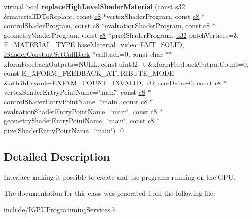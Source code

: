 \begin{DoxyCompactItemize}
\item 
virtual bool {\bfseries replace\+High\+Level\+Shader\+Material} (const \hyperlink{namespaceirr_ac66849b7a6ed16e30ebede579f9b47c6}{s32} \&material\+I\+D\+To\+Replace, const \hyperlink{namespaceirr_a9395eaea339bcb546b319e9c96bf7410}{c8} $\ast$vertex\+Shader\+Program, const \hyperlink{namespaceirr_a9395eaea339bcb546b319e9c96bf7410}{c8} $\ast$control\+Shader\+Program, const \hyperlink{namespaceirr_a9395eaea339bcb546b319e9c96bf7410}{c8} $\ast$evaluation\+Shader\+Program, const \hyperlink{namespaceirr_a9395eaea339bcb546b319e9c96bf7410}{c8} $\ast$geometry\+Shader\+Program, const \hyperlink{namespaceirr_a9395eaea339bcb546b319e9c96bf7410}{c8} $\ast$pixel\+Shader\+Program, \hyperlink{namespaceirr_a0416a53257075833e7002efd0a18e804}{u32} patch\+Vertices=3, \hyperlink{namespaceirr_1_1video_ac8e9b6c66f7cebabd1a6d30cbc5430f1}{E\+\_\+\+M\+A\+T\+E\+R\+I\+A\+L\+\_\+\+T\+Y\+PE} base\+Material=\hyperlink{namespaceirr_1_1video_ac8e9b6c66f7cebabd1a6d30cbc5430f1a9bc471b9c18c9e2d20496004d2a2e803}{video\+::\+E\+M\+T\+\_\+\+S\+O\+L\+ID}, \hyperlink{classirr_1_1video_1_1IShaderConstantSetCallBack}{I\+Shader\+Constant\+Set\+Call\+Back} $\ast$callback=0, const char $\ast$$\ast$xform\+Feedback\+Outputs=N\+U\+LL, const uint32\+\_\+t \&xform\+Feedback\+Output\+Count=0, const E\+\_\+\+X\+F\+O\+R\+M\+\_\+\+F\+E\+E\+D\+B\+A\+C\+K\+\_\+\+A\+T\+T\+R\+I\+B\+U\+T\+E\+\_\+\+M\+O\+DE \&attrib\+Layout=E\+X\+F\+A\+M\+\_\+\+C\+O\+U\+N\+T\+\_\+\+I\+N\+V\+A\+L\+ID, \hyperlink{namespaceirr_ac66849b7a6ed16e30ebede579f9b47c6}{s32} user\+Data=0, const \hyperlink{namespaceirr_a9395eaea339bcb546b319e9c96bf7410}{c8} $\ast$vertex\+Shader\+Entry\+Point\+Name=\char`\"{}main\char`\"{}, const \hyperlink{namespaceirr_a9395eaea339bcb546b319e9c96bf7410}{c8} $\ast$control\+Shader\+Entry\+Point\+Name=\char`\"{}main\char`\"{}, const \hyperlink{namespaceirr_a9395eaea339bcb546b319e9c96bf7410}{c8} $\ast$evaluation\+Shader\+Entry\+Point\+Name=\char`\"{}main\char`\"{}, const \hyperlink{namespaceirr_a9395eaea339bcb546b319e9c96bf7410}{c8} $\ast$geometry\+Shader\+Entry\+Point\+Name=\char`\"{}main\char`\"{}, const \hyperlink{namespaceirr_a9395eaea339bcb546b319e9c96bf7410}{c8} $\ast$pixel\+Shader\+Entry\+Point\+Name=\char`\"{}main\char`\"{})=0\hypertarget{classirr_1_1video_1_1IGPUProgrammingServices_a6e61f246a54fa3a0f2908ff5e318f499}{}\label{classirr_1_1video_1_1IGPUProgrammingServices_a6e61f246a54fa3a0f2908ff5e318f499}

\end{DoxyCompactItemize}


\subsection{Detailed Description}
Interface making it possible to create and use programs running on the G\+PU. 

The documentation for this class was generated from the following file\+:\begin{DoxyCompactItemize}
\item 
include/I\+G\+P\+U\+Programming\+Services.\+h\end{DoxyCompactItemize}
